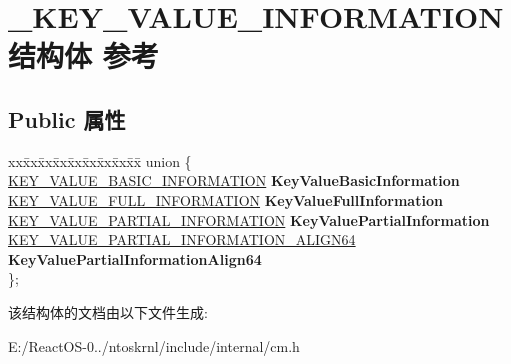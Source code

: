 \hypertarget{struct___k_e_y___v_a_l_u_e___i_n_f_o_r_m_a_t_i_o_n}{}\section{\+\_\+\+K\+E\+Y\+\_\+\+V\+A\+L\+U\+E\+\_\+\+I\+N\+F\+O\+R\+M\+A\+T\+I\+O\+N结构体 参考}
\label{struct___k_e_y___v_a_l_u_e___i_n_f_o_r_m_a_t_i_o_n}
\subsection*{Public 属性}
\begin{DoxyCompactItemize}
\item 
\mbox{\label{struct___k_e_y___v_a_l_u_e___i_n_f_o_r_m_a_t_i_o_n_a6f078c11ff2acdb43d369beb8d8e4533}} 
\begin{tabbing}
xx\=xx\=xx\=xx\=xx\=xx\=xx\=xx\=xx\=\kill
union \{\\
\>\hyperlink{struct___k_e_y___v_a_l_u_e___b_a_s_i_c___i_n_f_o_r_m_a_t_i_o_n}{KEY\_VALUE\_BASIC\_INFORMATION} {\bfseries KeyValueBasicInformation}\\
\>\hyperlink{struct___k_e_y___v_a_l_u_e___f_u_l_l___i_n_f_o_r_m_a_t_i_o_n}{KEY\_VALUE\_FULL\_INFORMATION} {\bfseries KeyValueFullInformation}\\
\>\hyperlink{struct___k_e_y___v_a_l_u_e___p_a_r_t_i_a_l___i_n_f_o_r_m_a_t_i_o_n}{KEY\_VALUE\_PARTIAL\_INFORMATION} {\bfseries KeyValuePartialInformation}\\
\>\hyperlink{struct___k_e_y___v_a_l_u_e___p_a_r_t_i_a_l___i_n_f_o_r_m_a_t_i_o_n___a_l_i_g_n64}{KEY\_VALUE\_PARTIAL\_INFORMATION\_ALIGN64} {\bfseries KeyValuePartialInformationAlign64}\\
\}; \\

\end{tabbing}\end{DoxyCompactItemize}


该结构体的文档由以下文件生成\+:\begin{DoxyCompactItemize}
\item 
E\+:/\+React\+O\+S-\/0../ntoskrnl/include/internal/cm.\+h\end{DoxyCompactItemize}
